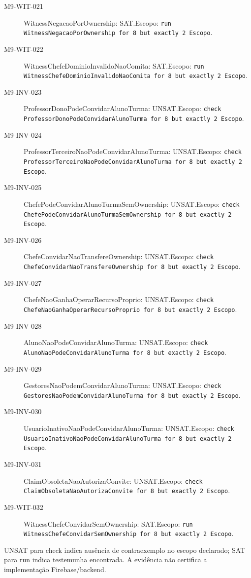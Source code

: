 \begin{description}
\item[M9-WIT-021] WitnessNegacaoPorOwnership: SAT.\newline Escopo: \texttt{run WitnessNegacaoPorOwnership for 8 but exactly 2 Escopo}.
\item[M9-WIT-022] WitnessChefeDominioInvalidoNaoComita: SAT.\newline Escopo: \texttt{run WitnessChefeDominioInvalidoNaoComita for 8 but exactly 2 Escopo}.
\item[M9-INV-023] ProfessorDonoPodeConvidarAlunoTurma: UNSAT.\newline Escopo: \texttt{check ProfessorDonoPodeConvidarAlunoTurma for 8 but exactly 2 Escopo}.
\item[M9-INV-024] ProfessorTerceiroNaoPodeConvidarAlunoTurma: UNSAT.\newline Escopo: \texttt{check ProfessorTerceiroNaoPodeConvidarAlunoTurma for 8 but exactly 2 Escopo}.
\item[M9-INV-025] ChefePodeConvidarAlunoTurmaSemOwnership: UNSAT.\newline Escopo: \texttt{check ChefePodeConvidarAlunoTurmaSemOwnership for 8 but exactly 2 Escopo}.
\item[M9-INV-026] ChefeConvidarNaoTransfereOwnership: UNSAT.\newline Escopo: \texttt{check ChefeConvidarNaoTransfereOwnership for 8 but exactly 2 Escopo}.
\item[M9-INV-027] ChefeNaoGanhaOperarRecursoProprio: UNSAT.\newline Escopo: \texttt{check ChefeNaoGanhaOperarRecursoProprio for 8 but exactly 2 Escopo}.
\item[M9-INV-028] AlunoNaoPodeConvidarAlunoTurma: UNSAT.\newline Escopo: \texttt{check AlunoNaoPodeConvidarAlunoTurma for 8 but exactly 2 Escopo}.
\item[M9-INV-029] GestoresNaoPodemConvidarAlunoTurma: UNSAT.\newline Escopo: \texttt{check GestoresNaoPodemConvidarAlunoTurma for 8 but exactly 2 Escopo}.
\item[M9-INV-030] UsuarioInativoNaoPodeConvidarAlunoTurma: UNSAT.\newline Escopo: \texttt{check UsuarioInativoNaoPodeConvidarAlunoTurma for 8 but exactly 2 Escopo}.
\item[M9-INV-031] ClaimObsoletaNaoAutorizaConvite: UNSAT.\newline Escopo: \texttt{check ClaimObsoletaNaoAutorizaConvite for 8 but exactly 2 Escopo}.
\item[M9-WIT-032] WitnessChefeConvidarSemOwnership: SAT.\newline Escopo: \texttt{run WitnessChefeConvidarSemOwnership for 8 but exactly 2 Escopo}.
\end{description}
UNSAT para check indica ausência de contraexemplo no escopo declarado; SAT para run indica testemunha encontrada. A evidência não certifica a implementação Firebase/backend.
